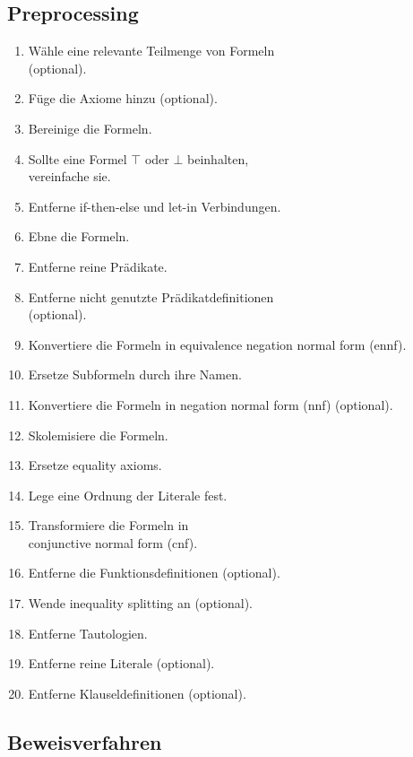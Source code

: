 \documentclass{article}
\begin{document}
\subsection{Preprocessing}
\label{subsec:preprocessing}
\begin{enumerate}
	\item Wähle eine relevante Teilmenge von Formeln \\(optional).
	\item Füge die Axiome hinzu (optional).
	\item Bereinige die Formeln.
	\item Sollte eine Formel $\top$ oder $\bot$ beinhalten, \\vereinfache sie.
	\item Entferne if-then-else und let-in Verbindungen.
	\item Ebne die Formeln.
	\item Entferne reine Prädikate.
	\item Entferne nicht genutzte Prädikatdefinitionen \\(optional).
	\item Konvertiere die Formeln in equivalence negation normal form (ennf).
	\item Ersetze Subformeln durch ihre Namen.
	\item Konvertiere die Formeln in negation normal form (nnf) (optional).
	\item Skolemisiere die Formeln.
	\item Ersetze equality axioms.
	\item Lege eine Ordnung der Literale fest.
	\item Transformiere die Formeln in \\conjunctive normal form (cnf).
	\item Entferne die Funktionsdefinitionen (optional).
	\item Wende inequality splitting an (optional).
	\item Entferne Tautologien.
	\item Entferne reine Literale (optional).
	\item Entferne Klauseldefinitionen (optional).
\end{enumerate}





\subsection{Beweisverfahren}
\label{subsec:proofmech}
\end{document}
